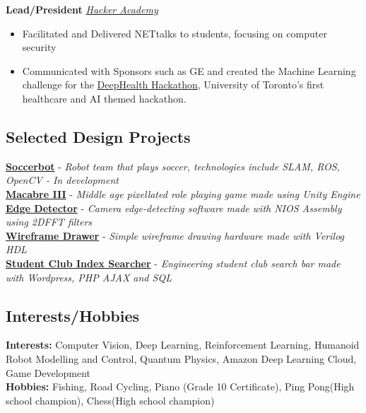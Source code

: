 \documentclass[10pt, a4paper]{cv}
\begin{document}
	\textbf{Lead/President} \hfill \emph{\href{http://hackeracademy.org}{Hacker Academy}}
	\begin{itemize}
		\item Facilitated and Delivered NETtalks to students, focusing on computer security
		\item Communicated with Sponsors such as GE and created the Machine Learning challenge for the \href{http://deephealth.ca}{DeepHealth Hackathon}, University of Toronto's first healthcare and AI themed hackathon.
	\end{itemize}
	
\subsection*{Selected Design Projects}
\noindent
{}\textbf{\href{http://github.com/utra-robosoccer/soccerbot}{Soccerbot}} - \emph{Robot team that plays soccer, technologies include SLAM, ROS, OpenCV - In development}\\
\textbf{\href{http://vuwij.com/index.php/macabre}{Macabre III}} - \emph{Middle age pixellated role playing game made using Unity Engine}\\
\textbf{\href{https://github.com/lpahlavi/EdgeDetector}{Edge Detector}} - \emph{Camera edge-detecting software made with NIOS Assembly using 2DFFT filters}\\
\textbf{\href{http://vuwij.com/index.php/projects1/80-programming-projects/93-3d-hardware-wireframe-renderer}{Wireframe Drawer}} - \emph{Simple wireframe drawing hardware made with Verilog HDL}\\
\textbf{\href{http://skule.ca/view-clubs/}{Student Club Index Searcher}} - \emph{Engineering student club search bar made with Wordpress, PHP AJAX and SQL}

\subsection*{Interests/Hobbies}
\textbf{Interests:} Computer Vision, Deep Learning, Reinforcement Learning, Humanoid Robot Modelling and Control, Quantum Physics, Amazon Deep Learning Cloud, Game Development\\
\textbf{Hobbies:} Fishing, Road Cycling, Piano (Grade 10 Certificate), Ping Pong(High school champion), Chess(High school champion)
\end{document}
